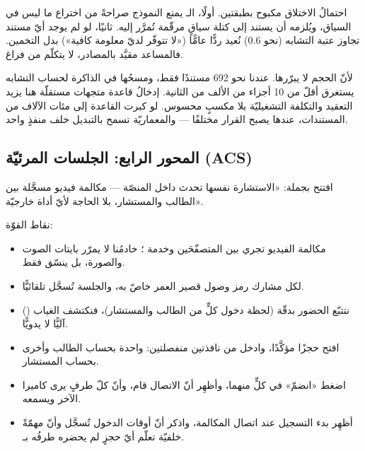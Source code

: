 \begin{qa}
احتمالُ الاختلاق مكبوح بطبقتين. أولًا، الـ يمنع النموذج صراحةً من
اختراع ما ليس في السياق، ويُلزمه أن يستند إلى كتلة سياقٍ مرقّمة تُمرَّر إليه. ثانيًا،
لو لم يوجد أيّ مستند تجاوز عتبة التشابه (نحو 0.6) نُعيد ردًّا عامًّا («لا تتوفّر لديّ
معلومة كافية») بدل التخمين. فالمساعد مقيَّد بالمصادر، لا يتكلّم من فراغ.
\end{qa}

\begin{qa}
لأنّ الحجم لا يبرّرها. عندنا نحو 692 مستندًا فقط، ومسحُها في الذاكرة لحساب التشابه
يستغرق أقلّ من 10 أجزاء من الألف من الثانية. إدخالُ قاعدة متجهات مستقلّة هنا يزيد
التعقيد والتكلفة التشغيليّة بلا مكسبٍ محسوس. لو كبرت القاعدة إلى مئات الآلاف من
المستندات، عندها يصبح القرار مختلفًا — والمعماريّة تسمح بالتبديل خلف منفذٍ واحد.
\end{qa}

\subsection{المحور الرابع: الجلسات المرئيّة (ACS)}

افتتح بجملة: «الاستشارة نفسها تحدث داخل المنصّة — مكالمة فيديو مسجَّلة بين الطالب
والمستشار، بلا الحاجة لأيّ أداة خارجيّة».

نقاط القوّة:
\begin{itemize}
\item مكالمة الفيديو تجري بين المتصفّحَين وخدمة ؛
  خادمُنا لا يمرّر بايتات الصوت والصورة، بل ينسّق فقط.
\item لكل مشارك رمز وصول قصير العمر خاصّ به، والجلسة تُسجَّل تلقائيًّا.
\item نتتبّع الحضور بدقّة (لحظة دخول كلٍّ من الطالب والمستشار)، فنكتشف الغياب
  () آليًّا لا يدويًّا.
\end{itemize}

\begin{idea}
\begin{itemize}
\item افتح حجزًا مؤكَّدًا، وادخل من نافذتين منفصلتين: واحدة بحساب الطالب وأخرى بحساب
  المستشار.
\item اضغط «انضمّ» في كلٍّ منهما، وأظهِر أنّ الاتصال قام، وأنّ كلّ طرفٍ يرى كاميرا
  الآخر ويسمعه.
\item أظهِر بدء التسجيل عند اتصال المكالمة، واذكر أنّ أوقات الدخول تُسجَّل وأنّ
  مهمّةً خلفيّة تعلّم أيّ حجزٍ لم يحضره طرفُه بـ.
\end{itemize}
\end{idea}

